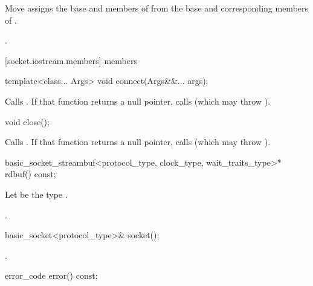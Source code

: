 \begin{itemdescr}
\pnum
\effects Move assigns the base and members of  from the base and corresponding members of .

\pnum
\returns {}.
\end{itemdescr}



[socket.iostream.members]{ members}

\begin{itemdecl}
template<class... Args>
  void connect(Args&&... args);
\end{itemdecl}

\begin{itemdescr}
\pnum
\effects Calls . If that function returns a null pointer, calls  (which may throw ).
\end{itemdescr}

\begin{itemdecl}
void close();
\end{itemdecl}

\begin{itemdescr}
\pnum
\effects Calls . If that function returns a null pointer, calls  (which may throw ).
\end{itemdescr}

\begin{itemdecl}
basic_socket_streambuf<protocol_type, clock_type, wait_traits_type>* rdbuf() const;
\end{itemdecl}

\begin{itemdescr}
\pnum
Let  be the type .

\pnum
\returns {}.
\end{itemdescr}

\begin{itemdecl}
basic_socket<protocol_type>& socket();
\end{itemdecl}

\begin{itemdescr}
\pnum
\returns {}.
\end{itemdescr}

\begin{itemdecl}
error_code error() const;
\end{itemdecl}

